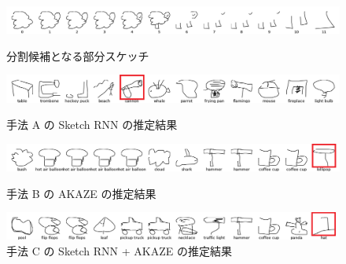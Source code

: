 \documentclass[twocolumn]{jarticle}     %
\begin{document}
\begin{figure}[tb]

 \begin{minipage}{1\hsize}
 	\begin{center}
 		\includegraphics[clip,width=170mm]{origin.png}
 		\caption{分割候補となる部分スケッチ}
 		\label{fig:exp2_o}
 	\end{center}
 \end{minipage}
\vspace{2zh}

  \begin{minipage}{1\hsize}
  	\begin{center}
  		\includegraphics[clip,width=170mm]{sheep_a.png}
  		\caption{手法 A の Sketch RNN の推定結果}
  		\label{fig:exp2_a}
  	\end{center}
  \end{minipage}
 \vspace{1.5zh}

   \begin{minipage}{1\hsize}
     \begin{center}
       \includegraphics[clip,width=170mm]{sheep_b.png}
       \caption{手法 B の AKAZE の推定結果}
       \label{fig:exp2_b}
     \end{center}
   \end{minipage}
  \vspace{1.5zh}

    \begin{minipage}{1\hsize}
      \begin{center}
        \includegraphics[clip,width=170mm]{sheep_c.png}
        \caption{手法 C の Sketch RNN + AKAZE の推定結果}
        \label{fig:exp2_c}
      \end{center}
    \end{minipage}

    \vspace{1zh}

\end{figure}
\end{document}
